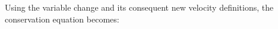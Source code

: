 Using  the variable change and its 
consequent new velocity definitions, the conservation 
equation becomes: 

